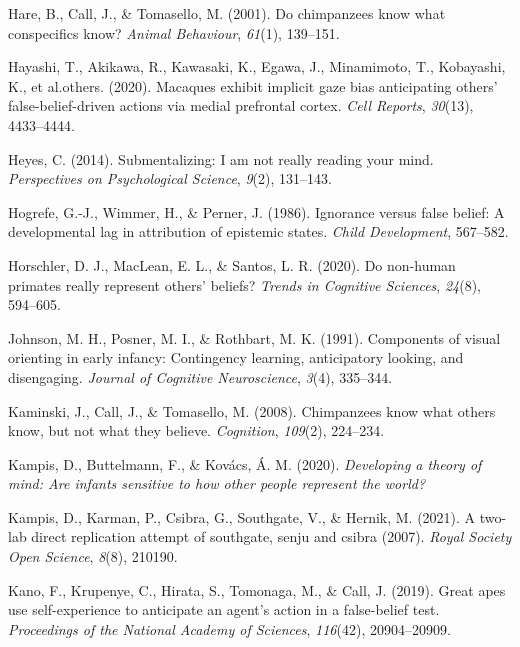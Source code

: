 \documentclass[
  man,floatsintext]{apa6}
\newlength{\cslhangindent}
\newenvironment{CSLReferences}[2] %
 {\begin{list}{}{%
  \setlength{\itemindent}{0pt}
  \setlength{\leftmargin}{0pt}
  \setlength{\parsep}{0pt}
  \ifodd #1
   \setlength{\leftmargin}{\cslhangindent}
   \setlength{\itemindent}{-1\cslhangindent}
  \fi
  \setlength{\itemsep}{#2\baselineskip}}}
 {\end{list}}
\begin{document}
\begin{CSLReferences}{1}{0}
Hare, B., Call, J., \& Tomasello, M. (2001). Do chimpanzees know what conspecifics know? \emph{Animal Behaviour}, \emph{61}(1), 139--151.

Hayashi, T., Akikawa, R., Kawasaki, K., Egawa, J., Minamimoto, T., Kobayashi, K., et al.others. (2020). Macaques exhibit implicit gaze bias anticipating others' false-belief-driven actions via medial prefrontal cortex. \emph{Cell Reports}, \emph{30}(13), 4433--4444.

Heyes, C. (2014). Submentalizing: I am not really reading your mind. \emph{Perspectives on Psychological Science}, \emph{9}(2), 131--143.

Hogrefe, G.-J., Wimmer, H., \& Perner, J. (1986). Ignorance versus false belief: A developmental lag in attribution of epistemic states. \emph{Child Development}, 567--582.

Horschler, D. J., MacLean, E. L., \& Santos, L. R. (2020). Do non-human primates really represent others' beliefs? \emph{Trends in Cognitive Sciences}, \emph{24}(8), 594--605.

Johnson, M. H., Posner, M. I., \& Rothbart, M. K. (1991). Components of visual orienting in early infancy: Contingency learning, anticipatory looking, and disengaging. \emph{Journal of Cognitive Neuroscience}, \emph{3}(4), 335--344.

Kaminski, J., Call, J., \& Tomasello, M. (2008). Chimpanzees know what others know, but not what they believe. \emph{Cognition}, \emph{109}(2), 224--234.

Kampis, D., Buttelmann, F., \& Kovács, Á. M. (2020). \emph{Developing a theory of mind: Are infants sensitive to how other people represent the world?}

Kampis, D., Karman, P., Csibra, G., Southgate, V., \& Hernik, M. (2021). A two-lab direct replication attempt of southgate, senju and csibra (2007). \emph{Royal Society Open Science}, \emph{8}(8), 210190.

Kano, F., Krupenye, C., Hirata, S., Tomonaga, M., \& Call, J. (2019). Great apes use self-experience to anticipate an agent's action in a false-belief test. \emph{Proceedings of the National Academy of Sciences}, \emph{116}(42), 20904--20909.


\end{CSLReferences}
\end{document}
